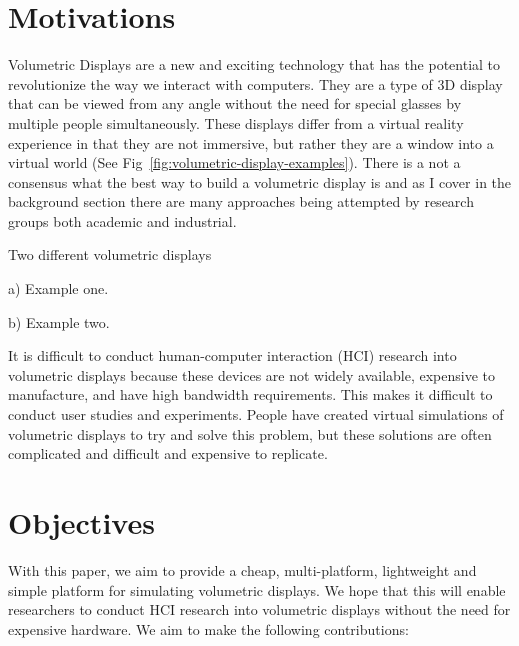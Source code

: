 \section{Motivations}

Volumetric Displays are a new and exciting technology that has the potential to revolutionize the way we interact with computers. They are a type of 3D display that can be viewed from any angle without the need for special glasses by multiple people simultaneously. \tocite These displays differ from a virtual reality experience in that they are not immersive, but rather they are a window into a virtual world (See Fig~\ref{fig:volumetric-display-examples}). There is a not a consensus what the best way to build a volumetric display is and as I cover in the background section there are many approaches being attempted by research groups both academic and industrial. 

\begin{figureBox}[label={fig:volumetric-display-examples}]{Two different volumetric displays}
    \begin{minipage}[t]{0.48\textwidth}
   
      \small {a) Example one.}
    \end{minipage}\hfill
    \begin{minipage}[t]{0.48\textwidth}

      \small {b) Example two.}
    \end{minipage}
\end{figureBox}

It is difficult to conduct human-computer interaction (HCI) research into volumetric displays because these devices are not widely available, expensive to manufacture, and have high bandwidth requirements. This makes it difficult to conduct user studies and experiments. People have created virtual simulations of volumetric displays to try and solve this problem, \tocite but these solutions are often complicated and difficult and expensive to replicate.

\section{Objectives}

With this paper, we aim to provide a cheap, multi-platform, lightweight and simple platform for simulating volumetric displays. We hope that this will enable researchers to conduct HCI research into volumetric displays without the need for expensive hardware. We aim to make the following contributions:
